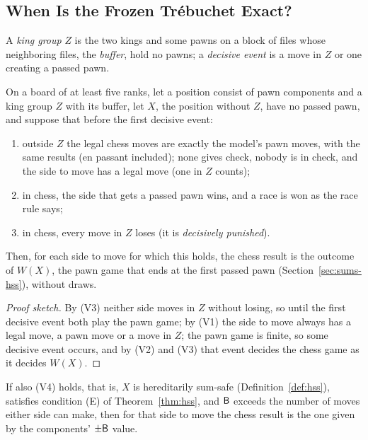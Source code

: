 \subsection{When Is the Frozen Tr\'ebuchet Exact?}\label{sec:kings-valid}

A \emph{king group} $Z$ is the two kings and some pawns on a block of files whose neighboring files, the
\emph{buffer}, hold no pawns; a \emph{decisive event} is a move in $Z$ or one creating a passed pawn.

\begin{theorem}\label{thm:validity}
On a board of at least five ranks, let a position consist of pawn components and a king group $Z$ with its buffer, let $X$, the position without $Z$, have no passed pawn, and suppose that before the
first decisive event:
\begin{enumerate}
\item[(V1)] outside $Z$ the legal chess moves are exactly the model's pawn moves, with the same results (en
  passant included); none gives check, nobody is in check, and the side to move has a legal move (one in $Z$
  counts);
\item[(V2)] in chess, the side that gets a passed pawn wins, and a race is won as the race rule says;
\item[(V3)] in chess, every move in $Z$ loses (it is \emph{decisively punished}).
\end{enumerate}
Then, for each side to move for which this holds, the chess result is the outcome of $W(X)$, the pawn game that ends at the first
passed pawn (Section~\ref{sec:sums-hss}), without draws.
\end{theorem}

\begin{proof}[Proof sketch]
By (V3) neither side moves in $Z$ without losing, so until the first decisive event both play the pawn game;
by (V1) the side to move always has a legal move, a pawn move or a move in $Z$; the pawn game is finite, so some
decisive event occurs, and by (V2) and (V3) that event
decides the chess game as it decides $W(X)$.
\end{proof}

\begin{corollary}[\lab{S}]\label{cor:v4}
If also (V4) holds, that is, $X$ is hereditarily sum-safe (Definition~\ref{def:hss}), satisfies condition (E) of
Theorem~\ref{thm:hss}, and $\mathsf{B}$ exceeds the number of moves either side can make, then for that side to move
the chess result is the one given by the components' $\pm\mathsf{B}$ value.
\end{corollary}

